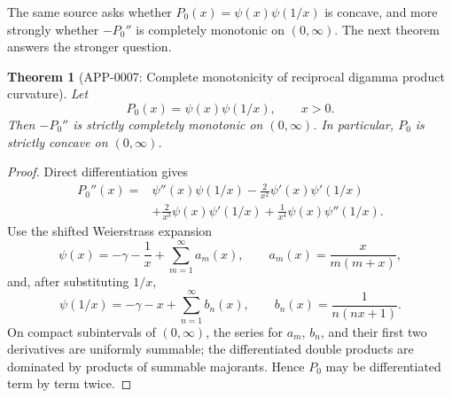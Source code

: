 \documentclass[11pt]{article}
\numberwithin{equation}{section}
\newtheorem{theorem}{Theorem}[section]
\theoremstyle{definition}
\theoremstyle{remark}
\newcommand{\1}{\mathbf 1}
\begin{document}
The same source asks whether \(P_0(x)=\psi(x)\psi(1/x)\) is concave, and more strongly whether \(-P_0''\) is completely monotonic on \((0,\infty)\).  The next theorem answers the stronger question.

\begin{theorem}[APP-0007: Complete monotonicity of reciprocal digamma product curvature]
\label{thm:reciprocal-digamma-product-complete-monotonicity}
Let
\begin{equation}
\label{eq:reciprocal-digamma-p0}
P_0(x)=\psi(x)\psi(1/x),\qquad x>0.
\end{equation}
Then \(-P_0''\) is strictly completely monotonic on \((0,\infty)\).  In particular, \(P_0\) is strictly concave on \((0,\infty)\).
\end{theorem}

\begin{proof}
Direct differentiation gives
\begin{equation}
\label{eq:p0-second-derivative}
\begin{aligned}
P_0''(x)
=&\psi''(x)\psi(1/x)
-\frac{2}{x^2}\psi'(x)\psi'(1/x)\\
&+\frac{2}{x^3}\psi(x)\psi'(1/x)
+\frac{1}{x^4}\psi(x)\psi''(1/x).
\end{aligned}
\end{equation}
Use the shifted Weierstrass expansion
\begin{equation}
\label{eq:digamma-shifted-expansion}
\psi(x)=-\gamma-\frac1x+\sum_{m=1}^{\infty}a_m(x),
\qquad
a_m(x)=\frac{x}{m(m+x)},
\end{equation}
and, after substituting \(1/x\),
\begin{equation}
\label{eq:reciprocal-digamma-shifted-expansion}
\psi(1/x)=-\gamma-x+\sum_{n=1}^{\infty}b_n(x),
\qquad
b_n(x)=\frac1{n(nx+1)}.
\end{equation}
On compact subintervals of \((0,\infty)\), the series for \(a_m\), \(b_n\), and their first two derivatives are uniformly summable; the differentiated double products are dominated by products of summable majorants.  Hence \(P_0\) may be differentiated term by term twice.


\end{proof}
\end{document}

